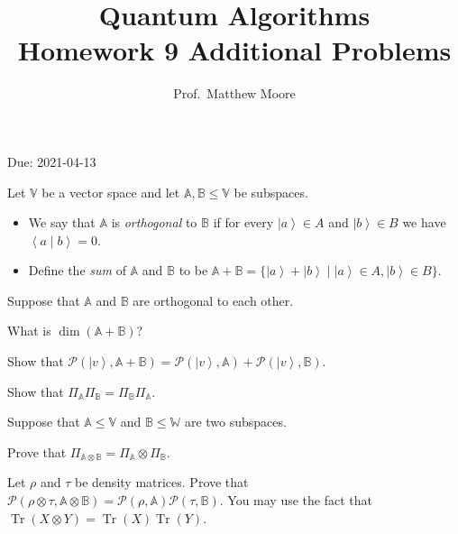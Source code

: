\documentclass[oneside]{amsart}  %
\newcommand{\m}[1]{\mathbb{#1}}      %
\newcommand{\alg}[1]{\m{#1}}         %
\theoremstyle{plain}
\theoremstyle{definition}
\theoremstyle{remark}
\newcommand{\ds}[1]{ \displaystyle{#1} }
\numberwithin{equation}{section}  %
\newif\ifsolutions
\newcommand{\Prob}{\mathcal{P}}
\DeclareMathOperator{\Tr}{ Tr }
\newcommand{\ket}[1]{ \left| #1 \right> }
\newcommand{\bracket}[2]{ \left< #1 \mid #2 \right> }
\begin{document}
\title[Quantum Algorithms, HW 9 Additional Problems]
  {Quantum Algorithms \\ Homework 9 Additional Problems}
\author{Prof.~Matthew Moore}
\maketitle

\vspace{-0.7em} \begin{center}
  \sc Due: 2021-04-13
\end{center}

\vspace{2em}

\begin{defn*}
Let $\alg{V}$ be a vector space and let $\alg{A}, \alg{B}\leq \alg{V}$ be
subspaces.
\begin{itemize}
  \item We say that $\alg{A}$ is \emph{orthogonal} to $\alg{B}$ if for every
    $\ket{a}\in A$ and $\ket{b}\in B$ we have $\bracket{a}{b} = 0$.
  \item Define the \emph{sum} of $\alg{A}$ and $\alg{B}$ to be
    $\ds{
      \alg{A} + \alg{B}
      = \Big\{ \ket{a} + \ket{b} \mid \ket{a}\in A, \ket{b}\in B \Big\}.
    }$
\end{itemize}
\end{defn*}
\begin{questions}
\item Suppose that $\alg{A}$ and $\alg{B}$ are orthogonal to each other.
\begin{questions}
  \item What is $\dim(\alg{A}+\alg{B})$?
  \item Show that $\Prob(\ket{v}, \alg{A}+\alg{B}) = \Prob(\ket{v}, \alg{A}) +
    \Prob(\ket{v}, \alg{B})$.
  \item Show that $\Pi_{\alg{A}}\Pi_{\alg{B}} = \Pi_{\alg{B}}\Pi_{\alg{A}}$.
\end{questions}
\item Suppose that $\alg{A}\leq \alg{V}$ and $\alg{B}\leq \alg{W}$ are two
subspaces. 
\begin{questions}
  \item Prove that $\Pi_{\alg{A}\otimes \alg{B}} = \Pi_{\alg{A}}\otimes
    \Pi_{\alg{B}}$.
  \item Let $\rho$ and $\tau$ be density matrices. Prove that
    $\Prob(\rho\otimes\tau, \alg{A}\otimes \alg{B}) =
    \Prob(\rho,\alg{A})\Prob(\tau,\alg{B})$. You may use the fact that
    $\Tr(X\otimes Y) = \Tr(X)\Tr(Y)$.
\end{questions}
\end{questions} 
\end{document}
